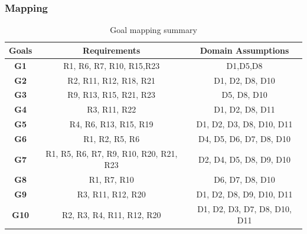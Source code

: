 \subsubsection{Mapping}
\begin{table} [H]
	\begin{tabular}{c|c|c}
		\textbf{Goals} & \textbf{Requirements} & \textbf{Domain Assumptions}\\
		\hline
		\textbf{G1} & R1, R6, R7, R10, R15,R23 & D1,D5,D8\\
		\hline
		\textbf{G2} & R2, R11, R12, R18, R21 & D1, D2, D8, D10\\
		\hline
		\textbf{G3} & R9, R13, R15, R21, R23 & D5, D8, D10\\
		\hline
		\textbf{G4} & R3, R11, R22 & D1, D2, D8, D11\\
		\hline
		\textbf{G5} & R4, R6, R13, R15, R19 & D1, D2, D3, D8, D10, D11\\
		\hline
		\textbf{G6} & R1, R2, R5, R6 & D4, D5, D6, D7, D8, D10\\
		\hline
		\textbf{G7} & R1, R5, R6, R7, R9, R10, R20, R21, R23 & D2, D4, D5, D8, D9, D10\\
		\hline
		\textbf{G8} & R1, R7, R10 & D6, D7, D8, D10\\
		\hline
		\textbf{G9} & R3, R11, R12, R20 & D1, D2, D8, D9, D10, D11\\
		\hline
		\textbf{G10} & R2, R3, R4, R11, R12, R20 & D1, D2, D3, D7, D8, D10, D11\\
	\end{tabular}
	\caption{Goal mapping summary}
	\label{tab:MappingSum}
\end{table}

